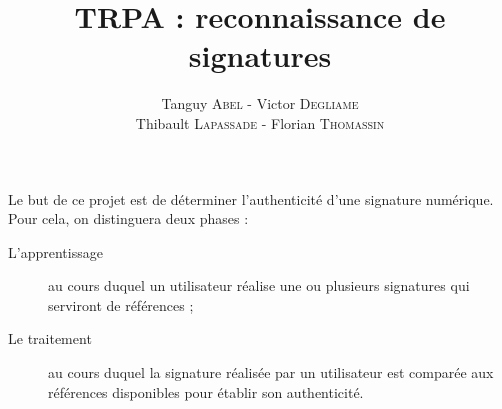 \documentclass[fontsize=12pt, twoside=no]{scrartcl} %
\begin{document}
\title{TRPA : reconnaissance de signatures}
\author{Tanguy \textsc{Abel} - Victor \textsc{Degliame}\\Thibault \textsc{Lapassade} - Florian \textsc{Thomassin}}
\date{}
\maketitle
\vspace*{-3cm}





\part{}

Le but de ce projet est de déterminer l'authenticité d'une signature numérique. Pour cela, on distinguera deux phases :

\begin{description}
\item[L'apprentissage] au cours duquel un utilisateur réalise une ou plusieurs signatures qui serviront de références ;
\item[Le traitement] au cours duquel la signature réalisée par un utilisateur est comparée aux références disponibles pour établir son authenticité.
\end{description}
\end{document}
